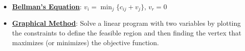 \documentclass{article}%
\begin{document}
\begin{itemize}[leftmargin=*]%
\item \href{https://www.math.purdue.edu/~yipn/421/2024-11-14-NetAppls.pdf#page=17}{\textbf{Bellman's Equation}}: $v_i = \min_{j} \{c_{ij} + v_j\}$, $v_r = 0$%
\end{itemize}%
\begin{itemize}[leftmargin=*]%
\item \href{https://www.math.purdue.edu/~yipn/421/2024-12-03-Duality.pdf#page=3}{\textbf{Graphical Method}}: Solve a linear program with two variables by plotting the constraints to define the feasible region and then finding the vertex that maximizes (or minimizes) the objective function.%
\end{itemize}

%
\end{document}
